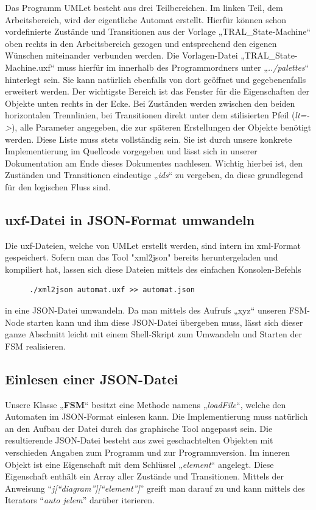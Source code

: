 Das Programm UMLet besteht aus drei Teilbereichen. Im linken Teil, dem
Arbeitsbereich, wird der eigentliche Automat erstellt. Hierfür können schon
vordefinierte Zustände und Transitionen aus der Vorlage „TRAL\_State-Machine“
oben rechts in den Arbeitsbereich gezogen und entsprechend den eigenen Wünschen
miteinander verbunden werden. Die Vorlagen-Datei „TRAL\_State-Machine.uxf“ muss
hierfür im innerhalb des Programmordners unter „\textit{../palettes}“ hinterlegt sein.
Sie kann natürlich ebenfalls von dort geöffnet und gegebenenfalls erweitert
werden.
Der wichtigste Bereich ist das Fenster für die Eigenschaften der Objekte unten rechts in der Ecke.
Bei Zuständen werden zwischen den beiden horizontalen Trennlinien, bei
Transitionen direkt unter dem stilisierten Pfeil (\textit{lt=->}), alle Parameter
angegeben, die zur späteren Erstellungen der Objekte benötigt werden. Diese
Liste muss stets vollständig sein. Sie ist durch unsere konkrete
Implementierung im Quellcode vorgegeben und lässt sich in unserer Dokumentation
am Ende dieses Dokumentes nachlesen.
Wichtig hierbei ist, den Zuständen und Transitionen eindeutige „\textit{ids}“ zu
vergeben, da diese grundlegend für den logischen Fluss sind.


\subsection{uxf-Datei in JSON-Format umwandeln}
Die uxf-Dateien, welche von UMLet erstellt werden, sind intern im xml-Format
gespeichert. Sofern man das Tool "xml2json" bereits heruntergeladen und
kompiliert hat, lassen sich diese Dateien mittels des einfachen Konsolen-Befehls

\begin{figure}[thp]
\begin{lstlisting}[style=json]
./xml2json automat.uxf >> automat.json

\end{lstlisting}
\centering
\end{figure}

in eine JSON-Datei umwandeln.
Da man mittels des Aufrufs „xyz“ unseren FSM-Node starten kann und ihm diese
JSON-Datei übergeben muss, lässt sich dieser ganze Abschnitt leicht mit einem
Shell-Skript zum Umwandeln und Starten der FSM realisieren.


\subsection{Einlesen einer JSON-Datei}
Unsere Klasse „\textbf{FSM}“ besitzt eine Methode namens „\textit{loadFile}“, welche den Automaten
im JSON-Format einlesen kann. Die Implementierung muss natürlich an den Aufbau
der Datei durch das graphische Tool angepasst sein. Die resultierende
JSON-Datei besteht aus zwei geschachtelten Objekten mit verschieden Angaben zum
Programm und zur Programmversion. Im inneren Objekt ist eine Eigenschaft mit dem
Schlüssel „\textit{element}“ angelegt. Diese Eigenschaft enthält ein Array aller Zustände
und Transitionen.
Mittels der Anweisung "`\textit{j["`diagram"']["`element"']}"' greift man
darauf zu und kann mittels des Iterators "`\textit{auto jelem}"' darüber iterieren.

